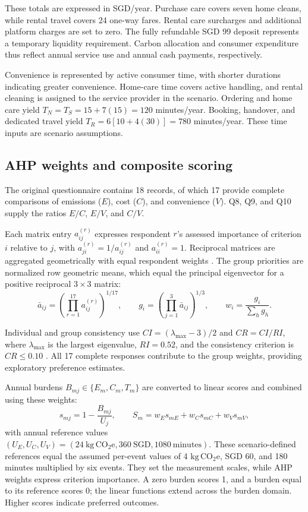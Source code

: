 \documentclass[11pt,a4paper]{article}
\newcommand{\co}{\ensuremath{\mathrm{kg\,CO_2e}}}
\begin{document}
These totals are expressed in SGD/year. Purchase care covers seven home cleans, while rental travel covers 24 one-way fares. Rental care surcharges and additional platform charges are set to zero. The fully refundable SGD 99 deposit represents a temporary liquidity requirement. Carbon allocation and consumer expenditure thus reflect annual service use and annual cash payments, respectively.

Convenience is represented by active consumer time, with shorter durations indicating greater convenience. Home-care time covers active handling, and rental cleaning is assigned to the service provider in the scenario. Ordering and home care yield $T_N=T_S=15+7(15)=120$ minutes/year. Booking, handover, and dedicated travel yield $T_R=6[10+4(30)]=780$ minutes/year. These time inputs are scenario assumptions.

\subsection{AHP weights and composite scoring}
The original questionnaire contains 18 records, of which 17 provide complete comparisons of emissions ($E$), cost ($C$), and convenience ($V$). Q8, Q9, and Q10 supply the ratios $E/C$, $E/V$, and $C/V$.

Each matrix entry $a_{ij}^{(r)}$ expresses respondent $r$'s assessed importance of criterion $i$ relative to $j$, with $a_{ji}^{(r)}=1/a_{ij}^{(r)}$ and $a_{ii}^{(r)}=1$. Reciprocal matrices are aggregated geometrically with equal respondent weights \citep{forman1998}. The group priorities are normalized row geometric means, which equal the principal eigenvector for a positive reciprocal $3\times3$ matrix:
\begin{equation}
\bar a_{ij}=\left(\prod_{r=1}^{17}a_{ij}^{(r)}\right)^{1/17},\qquad
 g_i=\left(\prod_{j=1}^{3}\bar a_{ij}\right)^{1/3},\qquad
 w_i=\frac{g_i}{\sum_h g_h}.
\label{eq:ahp}
\end{equation}

Individual and group consistency use $CI=(\lambda_{\max}-3)/2$ and $CR=CI/RI$, where $\lambda_{\max}$ is the largest eigenvalue, $RI=0.52$, and the consistency criterion is $CR\leq0.10$ \citep{saaty1994}. All 17 complete responses contribute to the group weights, providing exploratory preference estimates.

Annual burdens $B_{mj}\in\{E_m,C_m,T_m\}$ are converted to linear scores and combined using these weights:
\begin{equation}
s_{mj}=1-\frac{B_{mj}}{U_j},\qquad S_m=w_Es_{mE}+w_Cs_{mC}+w_Vs_{mV},
\label{eq:score}
\end{equation}
with annual reference values $(U_E,U_C,U_V)=(24\ \co,360\ \mathrm{SGD},1080\ \mathrm{minutes})$. These scenario-defined references equal the assumed per-event values of 4 \co, SGD 60, and 180 minutes multiplied by six events. They set the measurement scales, while AHP weights express criterion importance. A zero burden scores 1, and a burden equal to its reference scores 0; the linear functions extend across the burden domain. Higher scores indicate preferred outcomes.
\end{document}
